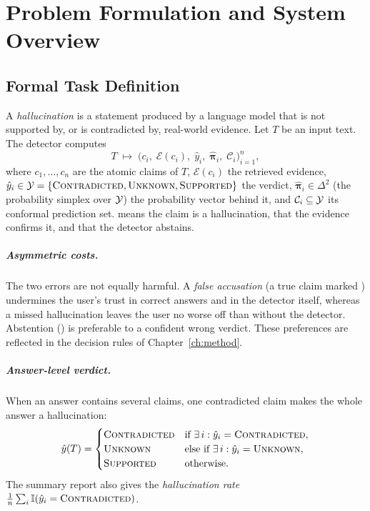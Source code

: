 \chapter{Problem Formulation and System Overview}
\label{ch:formulation}

\section{Formal Task Definition}

A \emph{hallucination} is a statement produced by a language model that is not supported by, or is contradicted by, real-world evidence. Let $T$ be an input text. The detector computes
\begin{equation}
  T \;\longmapsto\; \bigl( c_i,\; \mathcal{E}(c_i),\; \hat{y}_i,\; \hat{\bm{\pi}}_i,\; \mathcal{C}_i \bigr)_{i=1}^{n},
\end{equation}
where $c_1, \dots, c_n$ are the atomic claims of $T$, $\mathcal{E}(c_i)$ the retrieved evidence, $\hat{y}_i \in \mathcal{Y} = \{\textsc{Contradicted}, \textsc{Unknown}, \textsc{Supported}\}$ the verdict, $\hat{\bm{\pi}}_i \in \Delta^2$ (the probability simplex over $\mathcal{Y}$) the probability vector behind it, and $\mathcal{C}_i \subseteq \mathcal{Y}$ its conformal prediction set. \Con{} means the claim is a hallucination, \Sup{} that the evidence confirms it, and \Unk{} that the detector abstains.

\paragraph{Asymmetric costs.} The two errors are not equally harmful. A \emph{false accusation} (a true claim marked \Con) undermines the user's trust in correct answers and in the detector itself, whereas a missed hallucination leaves the user no worse off than without the detector. Abstention (\Unk) is preferable to a confident wrong verdict. These preferences are reflected in the decision rules of Chapter~\ref{ch:method}.

\paragraph{Answer-level verdict.} When an answer contains several claims, one contradicted claim makes the whole answer a hallucination:
\begin{equation}
  \hat{y}(T) = \begin{cases}
    \textsc{Contradicted} & \text{if } \exists\, i : \hat{y}_i = \textsc{Contradicted}, \\
    \textsc{Unknown} & \text{else if } \exists\, i : \hat{y}_i = \textsc{Unknown}, \\
    \textsc{Supported} & \text{otherwise.}
  \end{cases}
\end{equation}
The summary report also gives the \emph{hallucination rate} $\frac{1}{n} \sum_{i} \mathbb{I}(\hat{y}_i = \textsc{Contradicted})$.

